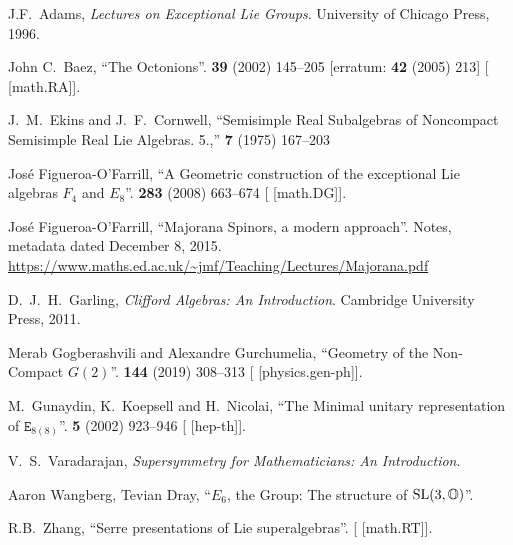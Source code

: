 \begin{thebibliography}{99}
\footnotesize%

J.F.\ Adams,
\textit{Lectures on Exceptional Lie Groups}.
University of Chicago Press, 1996.

John C.~Baez,
``The Octonions''.
 \textbf{39} (2002) 145--205
[erratum:  \textbf{42} (2005) 213]
{\tt{}}
[ [math.RA]].

J.~M.~Ekins and J.~F.~Cornwell,
``Semisimple Real Subalgebras of Noncompact Semisimple Real Lie Algebras. 5.,''
 \textbf{7} (1975) 167--203
{\tt{}}


Jos\'e Figueroa-O'Farrill,
``A Geometric construction of the exceptional Lie algebras $F_{4}$ and $E_{8}$''.
 \textbf{283} (2008) 663--674
{\tt{}}
[ [math.DG]].

Jos\'e Figueroa-O'Farrill,
``Majorana Spinors, a modern approach''.
Notes, metadata dated December 8, 2015.
\url{https://www.maths.ed.ac.uk/~jmf/Teaching/Lectures/Majorana.pdf}

  
D.~J.~H.~Garling,
\textit{Clifford Algebras: An Introduction}.
Cambridge University Press, 2011.

Merab Gogberashvili and Alexandre Gurchumelia,
``Geometry of the Non-Compact $G(2)$''.
 \textbf{144} (2019) 308--313
{\tt{}}
[ [physics.gen-ph]].

M.~Gunaydin, K.~Koepsell and H.~Nicolai,
``The Minimal unitary representation of $\mathtt{E}_{8(8)}$''.
 \textbf{5} (2002) 923--946
{\tt{}}
[ [hep-th]].

V.~S.~Varadarajan,
\textit{Supersymmetry for Mathematicians: An Introduction}.

Aaron Wangberg, Tevian Dray,
``$E_{6}$, the Group: The structure of $\operatorname{SL}(3,\mathbb{O})$''.

R.B.~Zhang,
``Serre presentations of Lie superalgebras''.
[ [math.RT]].

\end{thebibliography}


